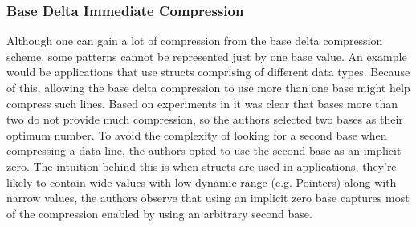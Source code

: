 \subsubsection{Base Delta Immediate Compression}
Although one can gain a lot of compression from the base delta compression scheme, some patterns cannot be represented just by one base value. An example would be applications that use structs comprising of different data types. Because of this, allowing the base delta compression to use more than one base might help compress such lines. Based on experiments in \cite{bdi} it was clear that bases more than two do not provide much compression, so the authors selected two bases as their optimum number. To avoid the complexity of looking for a second base when compressing a data line, the authors opted to use the second base as an implicit zero. The intuition behind this is when structs are used in applications, they're likely to contain wide values with low dynamic range (e.g. Pointers) along with narrow values, the authors observe that using an implicit zero base captures most of the compression enabled by using an arbitrary second base.
